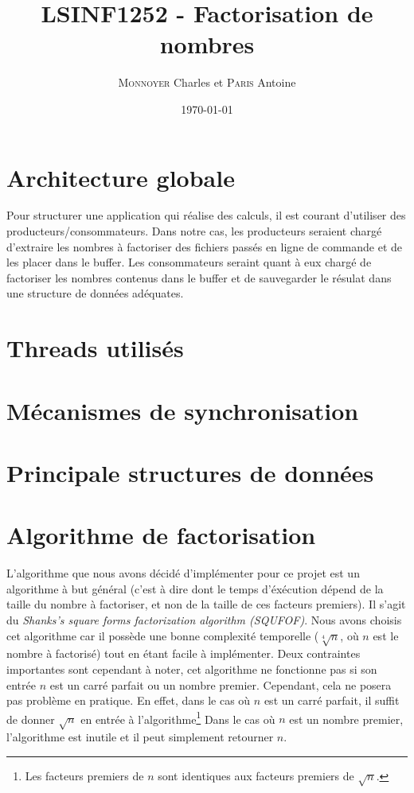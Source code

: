 \documentclass{scrartcl}
\title{LSINF1252 - Factorisation de nombres}
\author{\textsc{Monnoyer} Charles et \textsc{Paris} Antoine}
\date{\today}
\begin{document}
\maketitle

\section{Architecture globale}
Pour structurer une application qui réalise des calculs,
il est courant d'utiliser des producteurs/consommateurs\cite{syll}.
Dans notre cas, les producteurs seraient chargé d'extraire
les nombres à factoriser des fichiers passés en ligne
de commande et de les placer dans le buffer. Les
consommateurs seraint quant à eux chargé de factoriser
les nombres contenus dans le buffer et de sauvegarder
le résulat dans une structure de données adéquates. 

\section{Threads utilisés}

\section{Mécanismes de synchronisation}

\section{Principale structures de données}

\section{Algorithme de factorisation}
L'algorithme que nous avons décidé d'implémenter pour ce projet
est un algorithme à but général (c'est à dire dont le temps
d'éxécution dépend de la taille du nombre à factoriser, et
non de la taille de ces facteurs premiers). Il s'agit du
\textit{Shanks's square forms factorization algorithm (SQUFOF)}.
Nous avons choisis cet algorithme car il possède une bonne
complexité temporelle ($\sqrt[4]{n}$, où $n$ est le nombre à
factorisé) tout en étant facile à implémenter. Deux contraintes
importantes sont cependant à noter, cet algorithme ne fonctionne
pas si son entrée $n$ est un carré parfait ou un nombre premier. 
Cependant, cela ne posera pas problème en pratique.
En effet, dans le cas où $n$ est un carré parfait, il suffit de
donner $\sqrt{n}$ en entrée à l'algorithme\footnote{Les facteurs
premiers de $n$ sont identiques aux facteurs premiers de $\sqrt{n}$.}
Dans le cas où $n$ est un nombre premier, l'algorithme est inutile
et il peut simplement retourner $n$.



\end{document}
